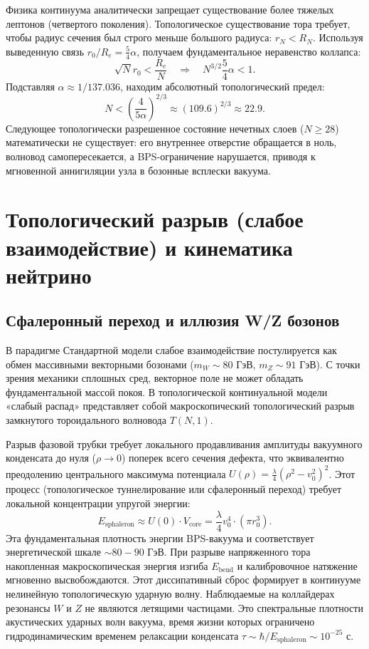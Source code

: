 \documentclass[12pt,a4paper]{article}
\begin{document}
Физика континуума аналитически запрещает существование более тяжелых лептонов (четвертого поколения). Топологическое существование тора требует, чтобы радиус сечения был строго меньше большого радиуса: $r_N < R_N$. Используя выведенную связь $r_0/R_e = \frac{5}{4}\alpha$, получаем фундаментальное неравенство коллапса:
\begin{equation}
	\sqrt{N} r_0 < \frac{R_e}{N} \quad \Longrightarrow \quad N^{3/2} \frac{5}{4}\alpha < 1.
\end{equation}
Подставляя $\alpha \approx 1/137.036$, находим абсолютный топологический предел:
\begin{equation}
	N < \left( \frac{4}{5\alpha} \right)^{2/3} \approx (109.6)^{2/3} \approx 22.9.
\end{equation}
Следующее топологически разрешенное состояние нечетных слоев ($N \ge 28$) математически не существует: его внутреннее отверстие обращается в ноль, волновод самопересекается, а BPS-ограничение нарушается, приводя к мгновенной аннигиляции узла в бозонные всплески вакуума.

\section{Топологический разрыв (слабое взаимодействие) и кинематика нейтрино}

\subsection{Сфалеронный переход и иллюзия W/Z бозонов}
В парадигме Стандартной модели слабое взаимодействие постулируется как обмен массивными векторными бозонами ($m_W \sim 80$ ГэВ, $m_Z \sim 91$ ГэВ). С точки зрения механики сплошных сред, векторное поле не может обладать фундаментальной массой покоя. В топологической континуальной модели «слабый распад» представляет собой макроскопический топологический разрыв замкнутого тороидального волновода $T(N,1)$.

Разрыв фазовой трубки требует локального продавливания амплитуды вакуумного конденсата до нуля ($\rho \to 0$) поперек всего сечения дефекта, что эквивалентно преодолению центрального максимума потенциала $U(\rho) = \frac{\lambda}{4}(\rho^2 - v_0^2)^2$. Этот процесс (топологическое туннелирование или сфалеронный переход) требует локальной концентрации упругой энергии:
\begin{equation}
	E_{\text{sphaleron}} \approx U(0) \cdot V_{\text{core}} = \frac{\lambda}{4} v_0^4 \cdot (\pi r_0^3).
\end{equation}
Эта фундаментальная плотность энергии BPS-вакуума и соответствует энергетической шкале $\sim 80-90$ ГэВ. При разрыве напряженного тора накопленная макроскопическая энергия изгиба $E_{\text{bend}}$ и калибровочное натяжение мгновенно высвобождаются. Этот диссипативный сброс формирует в континууме нелинейную топологическую ударную волну. 
Наблюдаемые на коллайдерах резонансы $W$ и $Z$ не являются летящими частицами. Это спектральные плотности акустических ударных волн вакуума, время жизни которых ограничено гидродинамическим временем релаксации конденсата $\tau \sim \hbar / E_{\text{sphaleron}} \sim 10^{-25}$ с. 
\end{document}
